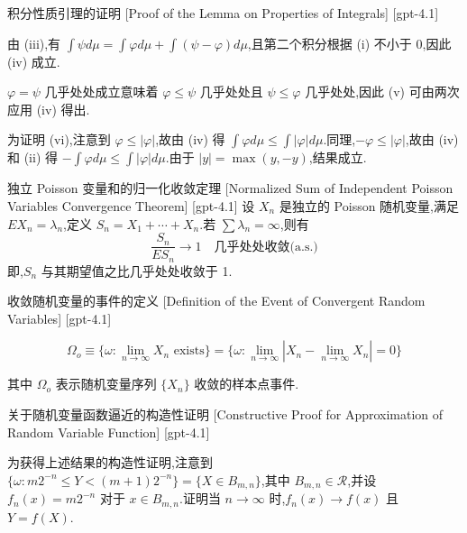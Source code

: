 \documentclass[UTF8]{ctexart}
\begin{document}
    
    
    \begin{prf}
        {积分性质引理的证明}
        [Proof of the Lemma on Properties of Integrals]
        [gpt-4.1]
        
由 (iii),有 $\int \psi d\mu = \int \varphi d\mu + \int (\psi - \varphi) d\mu$,且第二个积分根据 (i) 不小于 0,因此 (iv) 成立.

$\varphi = \psi$ 几乎处处成立意味着 $\varphi \leq \psi$ 几乎处处且 $\psi \leq \varphi$ 几乎处处,因此 (v) 可由两次应用 (iv) 得出.

为证明 (vi),注意到 $\varphi \leq |\varphi|$,故由 (iv) 得 $\int \varphi d\mu \leq \int |\varphi| d\mu$.同理,$-\varphi \leq |\varphi|$,故由 (iv) 和 (ii) 得 $-\int \varphi d\mu \leq \int |\varphi| d\mu$.由于 $|y| = \max(y, -y)$,结果成立.

    \end{prf}
    
    
    
    \begin{thm}
        {独立 Poisson 变量和的归一化收敛定理}
        [Normalized Sum of Independent Poisson Variables Convergence Theorem]
        [gpt-4.1]
        设 $X_n$ 是独立的 Poisson 随机变量,满足 $E X_n = \lambda_n$,定义 $S_n = X_1 + \cdots + X_n$.若 $\sum \lambda_n = \infty$,则有
\[
\frac{S_n}{E S_n} \to 1 \quad \text{几乎处处收敛(a.s.)}
\]
即,$S_n$ 与其期望值之比几乎处处收敛于 1.

    \end{thm}
    
    
    
    \begin{dfn}
        {收敛随机变量的事件的定义}
        [Definition of the Event of Convergent Random Variables]
        [gpt-4.1]
        
\[
\Omega_{o} \equiv \{ \omega : \lim_{n \to \infty} X_{n} \text{ exists} \} = \{ \omega : \lim_{n \to \infty} | X_{n} - \lim_{n \to \infty} X_{n} | = 0 \}
\]

其中 $\Omega_{o}$ 表示随机变量序列 $\{ X_n \}$ 收敛的样本点事件.

    \end{dfn}
    
    
    
    \begin{prf}
        {关于随机变量函数逼近的构造性证明}
        [Constructive Proof for Approximation of Random Variable Function]
        [gpt-4.1]
        
为获得上述结果的构造性证明,注意到 $\{\omega : m 2^{-n} \leq Y < (m+1) 2^{-n} \} = \{ X \in B_{m,n} \}$,其中 $B_{m,n} \in \mathcal{R}$,并设 $f_n(x) = m 2^{-n}$ 对于 $x \in B_{m,n}$.证明当 $n \to \infty$ 时,$f_n(x) \to f(x)$ 且 $Y = f(X)$.

    \end{prf}
    
\end{document}
